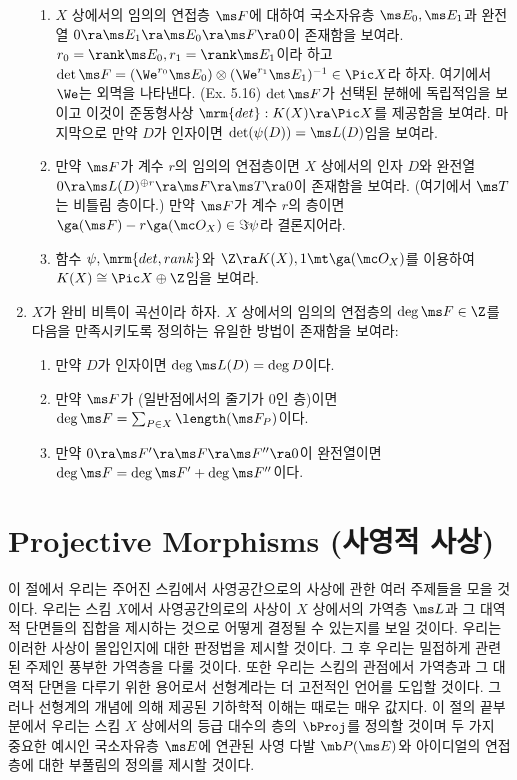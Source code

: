 \begin{enumerate}[label=\tb{6.\arabic*.},itemindent=0mm,itemsep=2mm]
{\begin{enumerate}[label=(\alph*)]
	\item $X$ 상에서의 임의의 연접층 $\ms F$에 대하여 국소자유층 $\ms E_0,\ms E_1$과
	완전열 $0\ra\ms E_1\ra\ms E_0\ra\ms F\ra 0$이 존재함을 보여라.
	$r_0=\rank\ms E_0,r_1=\rank\ms E_1$이라 하고 $\det\ms F=(\We^{r_0}\ms E_0)\otimes(\We^{r_1}\ms E_1)^{-1}\in\Pic X$라 하자.
	여기에서 $\We$는 외멱을 나타낸다. (Ex. 5.16)
	$\det\ms F$가 선택된 분해에 독립적임을 보이고 이것이 준동형사상 $\mrm{det}:K(X)\ra\Pic X$를 제공함을 보여라.
	마지막으로 만약 $D$가 인자이면 $\det(\psi(D))=\ms L(D)$임을 보여라.
	\item 만약 $\ms F$가 계수 $r$의 임의의 연접층이면 $X$ 상에서의 인자 $D$와
	완전열 $0\ra\ms L(D)^{\oplus r}\ra\ms F\ra\ms T\ra 0$이 존재함을 보여라. (여기에서 $\ms T$는 비틀림 층이다.)
	만약 $\ms F$가 계수 $r$의 층이면 $\ga(\ms F)-r\ga(\mc O_X)\in\Im\psi$라 결론지어라.
	\item 함수 $\psi,\mrm{det,rank}$와 $\Z\ra K(X),1\mt\ga(\mc O_X)$를 이용하여 $K(X)\cong\Pic X\oplus\Z$임을 보여라.
	\end{enumerate}}
	\item $X$가 완비 비특이 곡선이라 하자. $X$ 상에서의 임의의 연접층의 
	$\deg\ms F\in\Z$를 다음을 만족시키도록 정의하는 유일한 방법이 존재함을 보여라:
	\begin{enumerate}[label=(\arabic*)]
	\item 만약 $D$가 인자이면 $\deg\ms L(D)=\deg D$이다.
	\item 만약 $\ms F$가 (일반점에서의 줄기가 0인 층)이면 $\deg\ms F=\sum_{P\in X}\length(\ms F_P)$이다.
	\item 만약 $0\ra\ms F'\ra\ms F\ra\ms F''\ra 0$이 완전열이면 $\deg\ms F=\deg\ms F'+\deg\ms F''$이다.
	\end{enumerate}
	\end{enumerate}
	
	
	
	\section{Projective Morphisms (사영적 사상)}
	
	이 절에서 우리는 주어진 스킴에서 사영공간으로의 사상에 관한 여러 주제들을 모을 것이다.
	우리는 스킴 $X$에서 사영공간의로의 사상이 $X$ 상에서의 가역층 $\ms L$과 그 대역적 단면들의 집합을 제시하는 것으로
	어떻게 결정될 수 있는지를 보일 것이다.
	우리는 이러한 사상이 몰입인지에 대한 판정법을 제시할 것이다.
	그 후 우리는 밀접하게 관련된 주제인 풍부한 가역층을 다룰 것이다.
	또한 우리는 스킴의 관점에서 가역층과 그 대역적 단면을 다루기 위한 용어로서 선형계라는 더 고전적인 언어를 도입할 것이다.
	그러나 선형계의 개념에 의해 제공된 기하학적 이해는 때로는 매우 값지다.
	이 절의 끝부분에서 우리는 스킴 $X$ 상에서의 등급 대수의 층의 $\bProj$를 정의할 것이며
	두 가지 중요한 예시인 국소자유층 $\ms E$에 연관된 사영 다발 $\mb P(\ms E)$와
	아이디얼의 연접층에 대한 부풀림의 정의를 제시할 것이다.
	
